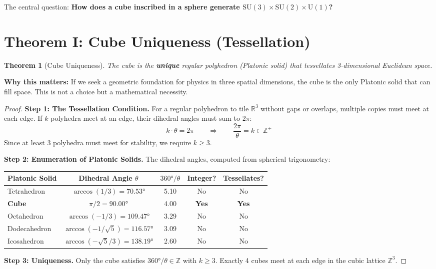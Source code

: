\documentclass[11pt,a4paper]{article}
\theoremstyle{plain}
\newtheorem{theorem}{Theorem}[section]
\theoremstyle{definition}
\theoremstyle{remark}
\newcommand{\SUthree}{\text{SU}(3)}
\newcommand{\SUtwo}{\text{SU}(2)}
\newcommand{\Uone}{\text{U}(1)}
\begin{document}
The central question: \textbf{How does a cube inscribed in a sphere generate $\SUthree \times \SUtwo \times \Uone$?}

\section{Theorem I: Cube Uniqueness (Tessellation)}

\begin{theorem}[Cube Uniqueness]
The cube is the \textbf{unique} regular polyhedron (Platonic solid) that tessellates 3-dimensional Euclidean space.
\end{theorem}

\textbf{Why this matters:} If we seek a geometric foundation for physics in three spatial dimensions, the cube is the only Platonic solid that can fill space. This is not a choice but a mathematical necessity.

\begin{proof}
\textbf{Step 1: The Tessellation Condition.} For a regular polyhedron to tile $\mathbb{R}^3$ without gaps or overlaps, multiple copies must meet at each edge. If $k$ polyhedra meet at an edge, their dihedral angles must sum to $2\pi$:
\[
k \cdot \theta = 2\pi \qquad \Rightarrow \qquad \frac{2\pi}{\theta} = k \in \mathbb{Z}^+
\]
Since at least 3 polyhedra must meet for stability, we require $k \geq 3$.

\textbf{Step 2: Enumeration of Platonic Solids.} The dihedral angles, computed from spherical trigonometry:

\begin{center}
\begin{tabular}{lcccc}
\toprule
\textbf{Platonic Solid} & \textbf{Dihedral Angle} $\theta$ & $360°/\theta$ & \textbf{Integer?} & \textbf{Tessellates?} \\
\midrule
Tetrahedron & $\arccos(1/3) = 70.53°$ & 5.10 & No & No \\
\textbf{Cube} & $\pi/2 = 90.00°$ & 4.00 & \textbf{Yes} & \textbf{Yes} \\
Octahedron & $\arccos(-1/3) = 109.47°$ & 3.29 & No & No \\
Dodecahedron & $\arccos(-1/\sqrt{5}) = 116.57°$ & 3.09 & No & No \\
Icosahedron & $\arccos(-\sqrt{5}/3) = 138.19°$ & 2.60 & No & No \\
\bottomrule
\end{tabular}
\end{center}

\textbf{Step 3: Uniqueness.} Only the cube satisfies $360°/\theta \in \mathbb{Z}$ with $k \geq 3$. Exactly 4 cubes meet at each edge in the cubic lattice $\mathbb{Z}^3$.
\end{proof}
\end{document}

